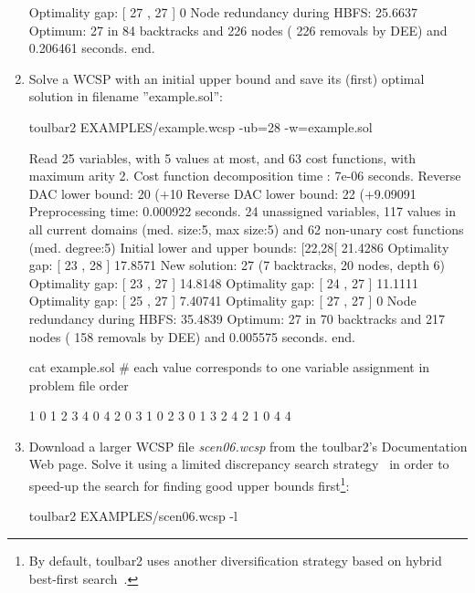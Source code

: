 \begin{enumerate}
{\begin{DoxyCode}
Optimality gap: [ 27 , 27 ] 0 %
Node redundancy during HBFS: 25.6637 %
Optimum: 27 in 84 backtracks and 226 nodes ( 226 removals by DEE) and 0.206461 seconds.
end.
\end{DoxyCode}}
\item Solve a WCSP with an initial upper bound and save its (first) optimal solution
in filename ''example.sol'':
\begin{DoxyCode}
	toulbar2 EXAMPLES/example.wcsp -ub=28 -w=example.sol
\end{DoxyCode}
{\scriptsize
\begin{DoxyCode}
Read 25 variables, with 5 values at most, and 63 cost functions, with maximum arity 2.
Cost function decomposition time : 7e-06 seconds.
Reverse DAC lower bound: 20 (+10%
Reverse DAC lower bound: 22 (+9.09091%
Preprocessing time: 0.000922 seconds.
24 unassigned variables, 117 values in all current domains (med. size:5, max size:5) and 62 non-unary cost functions (med. degree:5)
Initial lower and upper bounds: [22,28[ 21.4286%
Optimality gap: [ 23 , 28 ] 17.8571 %
New solution: 27 (7 backtracks, 20 nodes, depth 6)
Optimality gap: [ 23 , 27 ] 14.8148 %
Optimality gap: [ 24 , 27 ] 11.1111 %
Optimality gap: [ 25 , 27 ] 7.40741 %
Optimality gap: [ 27 , 27 ] 0 %
Node redundancy during HBFS: 35.4839 %
Optimum: 27 in 70 backtracks and 217 nodes ( 158 removals by DEE) and 0.005575 seconds.
end.
\end{DoxyCode}}
\begin{DoxyCode}
cat example.sol
# each value corresponds to one variable assignment in problem file order
\end{DoxyCode}
{\scriptsize
\begin{DoxyCode}
1 0 1 2 3 4 0 4 2 0 3 1 0 2 3 0 1 3 2 4 2 1 0 4 4
\end{DoxyCode}}
\item Download a larger WCSP file {\em scen06.wcsp} from the toulbar2's Documentation Web page. Solve it using a limited discrepancy search strategy~\cite{Ginsberg95} in order to speed-up the search for finding good upper bounds first\footnote{By default, toulbar2 uses another diversification strategy based on hybrid best-first search~\cite{Katsirelos15a}.}:
\begin{DoxyCode}
	toulbar2 EXAMPLES/scen06.wcsp -l
\end{DoxyCode}
{\scriptsize
\begin{DoxyCode}

\end{DoxyCode}}
\end{enumerate}
